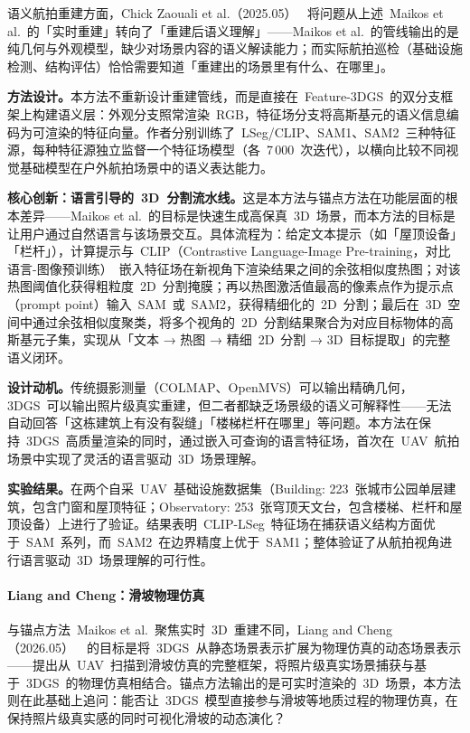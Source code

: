 语义航拍重建方面，Chick Zaouali et al.（2025.05）~\cite{2505_17402} 将问题从上述~Maikos et al.~的「实时重建」转向了「重建后语义理解」——Maikos et al.~的管线输出的是纯几何与外观模型，缺少对场景内容的语义解读能力；而实际航拍巡检（基础设施检测、结构评估）恰恰需要知道「重建出的场景里有什么、在哪里」。

\textbf{方法设计。}本方法不重新设计重建管线，而是直接在~Feature-3DGS~的双分支框架上构建语义层：外观分支照常渲染~RGB，特征场分支将高斯基元的语义信息编码为可渲染的特征向量。作者分别训练了~LSeg/CLIP、SAM1、SAM2~三种特征源，每种特征源独立监督一个特征场模型（各~7\,000~次迭代），以横向比较不同视觉基础模型在户外航拍场景中的语义表达能力。

\textbf{核心创新：语言引导的~3D~分割流水线。}这是本方法与锚点方法在功能层面的根本差异——Maikos et al.~的目标是快速生成高保真~3D~场景，而本方法的目标是让用户通过自然语言与该场景交互。具体流程为：给定文本提示（如「屋顶设备」「栏杆」），计算提示与~CLIP（Contrastive Language-Image Pre-training，对比语言-图像预训练）~嵌入特征场在新视角下渲染结果之间的余弦相似度热图；对该热图阈值化获得粗粒度~2D~分割掩膜；再以热图激活值最高的像素点作为提示点（prompt point）输入~SAM~或~SAM2，获得精细化的~2D~分割；最后在~3D~空间中通过余弦相似度聚类，将多个视角的~2D~分割结果聚合为对应目标物体的高斯基元子集，实现从「文本 → 热图 → 精细~2D~分割 → 3D~目标提取」的完整语义闭环。

\textbf{设计动机。}传统摄影测量（COLMAP、OpenMVS）可以输出精确几何，3DGS~可以输出照片级真实重建，但二者都缺乏场景级的语义可解释性——无法自动回答「这栋建筑上有没有裂缝」「楼梯栏杆在哪里」等问题。本方法在保持~3DGS~高质量渲染的同时，通过嵌入可查询的语言特征场，首次在~UAV~航拍场景中实现了灵活的语言驱动~3D~场景理解。

\textbf{实验结果。}在两个自采~UAV~基础设施数据集（Building: 223~张城市公园单层建筑，包含门窗和屋顶特征；Observatory: 253~张穹顶天文台，包含楼梯、栏杆和屋顶设备）上进行了验证。结果表明~CLIP-LSeg~特征场在捕获语义结构方面优于~SAM~系列，而~SAM2~在边界精度上优于~SAM1；整体验证了从航拍视角进行语言驱动~3D~场景理解的可行性。

\paragraph{Liang and Cheng：滑坡物理仿真}

与锚点方法~Maikos et al.~聚焦实时~3D~重建不同，Liang and Cheng（2026.05）~\cite{2605_10715}~的目标是将~3DGS~从静态场景表示扩展为物理仿真的动态场景表示——提出从~UAV~扫描到滑坡仿真的完整框架，将照片级真实场景捕获与基于~3DGS~的物理仿真相结合。锚点方法输出的是可实时渲染的~3D~场景，本方法则在此基础上追问：能否让~3DGS~模型直接参与滑坡等地质过程的物理仿真，在保持照片级真实感的同时可视化滑坡的动态演化？

